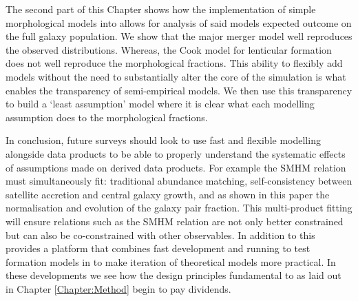 The second part of this Chapter shows how the implementation of simple morphological models into \steel allows for analysis of said models expected outcome on the full galaxy population. We show that the major merger model well reproduces the observed distributions. Whereas, the Cook model for lenticular formation does not well reproduce the morphological fractions. This ability to flexibly add models without the need to substantially alter the core of the simulation is what enables the transparency of semi-empirical models. We then use this transparency to build a `least assumption' model where it is clear what each modelling assumption does to the morphological fractions.

In conclusion, future surveys should look to use fast and flexible modelling alongside data products to be able to properly understand the systematic effects of assumptions made on derived data products. For example the SMHM relation must simultaneously fit: traditional abundance matching, self-consistency between satellite accretion and central galaxy growth, and as shown in this paper the normalisation and evolution of the galaxy pair fraction. This multi-product fitting will ensure relations such as the SMHM relation are not only better constrained but can also be co-constrained with other observables. In addition to this \steel provides a platform that combines fast development and running to test formation models in to make iteration of theoretical models more practical. In these developments we see how the design principles fundamental to \steel as laid out in Chapter \ref{Chapter:Method} begin to pay dividends.
